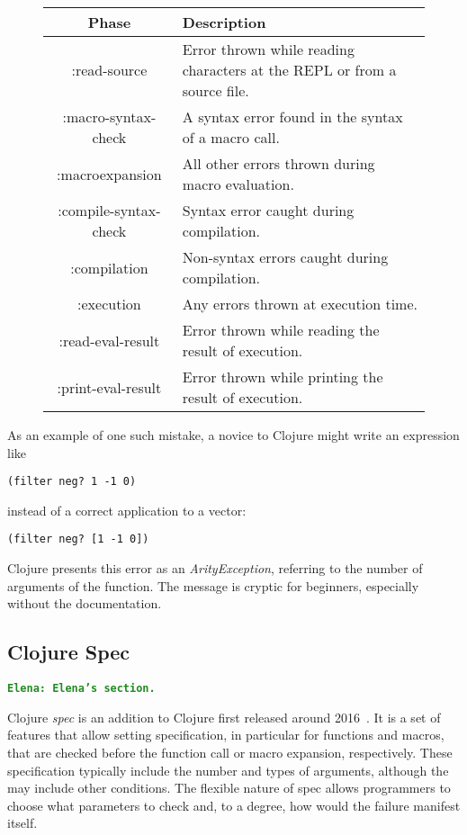 \documentclass[12pt]{article}
\newcommand{\comment}[1]{{\bf \tt  {#1}}}
\newcommand{\emcomment}[1]{\textcolor{ForestGreen}{\comment{Elena: {#1}}}}
\begin{document}
	\begin{figure}[h]
		\centering
		\begin{tabular}{|c|l|}
			\hline
			\textbf{Phase} & \textbf{Description} \\
			\hline
			:read-source & Error thrown while reading characters at the REPL or from a source file. \\
			:macro-syntax-check & A syntax error found in the syntax of a macro call. \\
			:macroexpansion & All other errors thrown during macro evaluation. \\
			:compile-syntax-check & Syntax error caught during compilation. \\
			:compilation & Non-syntax errors caught during compilation. \\
			:execution & Any errors thrown at execution time. \\
			:read-eval-result & Error thrown while reading the result of execution. \\
			:print-eval-result & Error thrown while printing the result of execution. \\
			\hline
		\end{tabular}
	\end{figure}
	

As an example of one such mistake, a novice to Clojure might write an expression like
\begin{verbatim}
(filter neg? 1 -1 0)
\end{verbatim}
instead of a correct application to a vector:
\begin{verbatim}
(filter neg? [1 -1 0])
\end{verbatim}
 Clojure presents this error as an {\it ArityException}, referring to the number of arguments of the function. 
 The message is cryptic for beginners, especially without the documentation.

\subsection{Clojure Spec}\label{subsec:spec}
\emcomment{Elena's section.}

Clojure \textit{spec} is an addition to Clojure first released around 2016~\cite{spec-overview}.
It is a set of features that allow setting specification, in particular for functions and macros, that are checked before the function call or macro expansion, respectively. 
These specification typically include the number and types of arguments, although the may include other conditions.
The flexible nature of spec allows programmers to choose what parameters to check and, to a degree, how would the failure manifest itself. 
\end{document}
